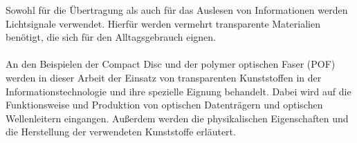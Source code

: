 Sowohl für die Übertragung als auch für das Auslesen von Informationen werden Lichtsignale
verwendet. Hierfür werden vermehrt transparente Materialien benötigt, die sich für den
Alltagsgebrauch eignen.

\paragraph{}
An den Beispielen der Compact Disc und der polymer optischen Faser (POF) werden in dieser Arbeit
der Einsatz von transparenten Kunststoffen in der Informationstechnologie und ihre spezielle
Eignung behandelt. Dabei wird auf die Funktionsweise und Produktion von optischen Datenträgern und
optischen Wellenleitern eingangen. Außerdem werden die physikalischen Eigenschaften und die
Herstellung der verwendeten Kunststoffe erläutert.
